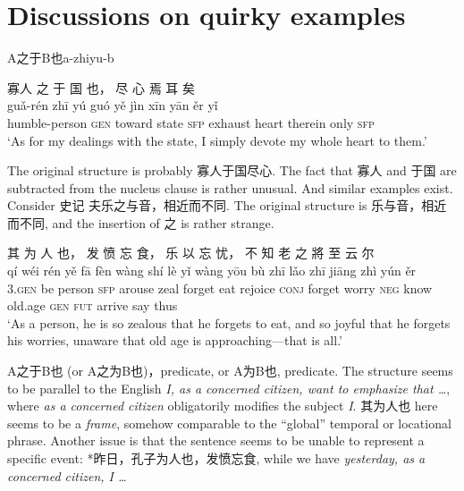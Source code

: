 \documentclass[UTF8, a4paper, oneside, scheme=plain, 12pt]{ctexrep}
\newcommand{\form}[1]{\emph{#1}}
\newcommand{\translate}[1]{`#1'}
\newcommand*{\category}[1]{\textsc{#1}}
\begin{document}
\chapter{Discussions on quirky examples}

\begin{todobox}{A之于B也}{a-zhiyu-b}
    \begin{exe}
        \ex
        \glll 寡人 之 于 国 也， 尽 心 焉 耳 矣 \\
        guǎ-rén zhī yú guó yě jìn xīn yān ěr yǐ \\
        humble-person \category{gen} toward state \category{sfp} exhaust heart therein only \category{sfp} \\
        \glt\translate{As for my dealings with the state, I simply devote my whole heart to them.}
    \end{exe}
    The original structure is probably 寡人于国尽心.
    The fact that 寡人 and 于国 are subtracted from the nucleus clause is rather unusual.
    And similar examples exist.
    Consider 史记 夫乐之与音，相近而不同.
    The original structure is 乐与音，相近而不同,
    and the insertion of 之 is rather strange.

    \begin{exe}
        \ex
        \glll 其 为 人 也， 发 愤 忘 食， 乐 以 忘 忧， 不 知 老 之 將 至 云 尔 \\
        qí wéi rén yě fā fèn wàng shí lè yǐ wàng yōu bù zhī lǎo zhī jiāng zhì yún ěr \\
        3.\category{gen} be person \category{sfp} arouse zeal forget eat rejoice \category{conj} forget worry \category{neg} know old.age \category{gen} \category{fut} arrive say thus \\
        \glt\translate{As a person, he is so zealous that he forgets to eat, and so joyful that he forgets his worries, unaware that old age is approaching---that is all.}
    \end{exe}

    A之于B也 (or A之为B也)，predicate, or A为B也, predicate.
    The structure seems to be parallel to the English
    \form{I, as a concerned citizen, want to emphasize that \dots},
    where \form{as a concerned citizen} obligatorily modifies the subject \form{I}.
    其为人也 here seems to be a \emph{frame}, somehow comparable to the ``global'' temporal or locational phrase.
    Another issue is that the sentence seems to be unable to represent a specific event:
    *昨日，孔子为人也，发愤忘食, while we have \form{yesterday, as a concerned citizen, I \dots}
    

\end{todobox}
\end{document}

